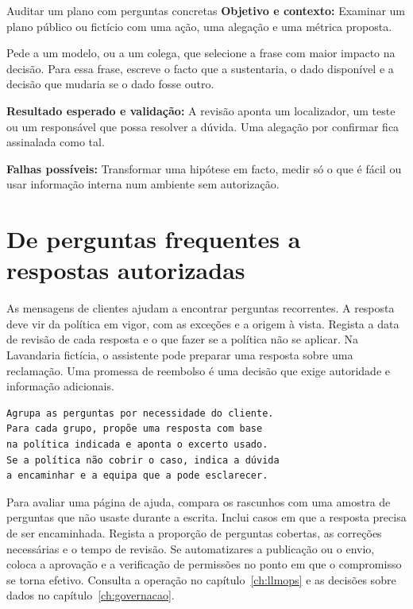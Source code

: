 \begin{promptlabbox}{Auditar um plano com perguntas concretas}
\textbf{Objetivo e contexto:} Examinar um plano público ou fictício com uma ação, uma alegação e uma métrica proposta.

Pede a um modelo, ou a um colega, que selecione a frase com maior impacto na decisão. Para essa frase, escreve o facto que a sustentaria, o dado disponível e a decisão que mudaria se o dado fosse outro.

\textbf{Resultado esperado e validação:} A revisão aponta um localizador, um teste ou um responsável que possa resolver a dúvida. Uma alegação por confirmar fica assinalada como tal.

\textbf{Falhas possíveis:} Transformar uma hipótese em facto, medir só o que é fácil ou usar informação interna num ambiente sem autorização.
\end{promptlabbox}

\section{De perguntas frequentes a respostas autorizadas}

As mensagens de clientes ajudam a encontrar perguntas recorrentes. A resposta deve vir da política em vigor, com as exceções e a origem à vista. Regista a data de revisão de cada resposta e o que fazer se a política não se aplicar. Na Lavandaria fictícia, o assistente pode preparar uma resposta sobre uma reclamação. Uma promessa de reembolso é uma decisão que exige autoridade e informação adicionais.

\begin{lstlisting}
Agrupa as perguntas por necessidade do cliente.
Para cada grupo, propõe uma resposta com base
na política indicada e aponta o excerto usado.
Se a política não cobrir o caso, indica a dúvida
a encaminhar e a equipa que a pode esclarecer.
\end{lstlisting}

Para avaliar uma página de ajuda, compara os rascunhos com uma amostra de perguntas que não usaste durante a escrita. Inclui casos em que a resposta precisa de ser encaminhada. Regista a proporção de perguntas cobertas, as correções necessárias e o tempo de revisão. Se automatizares a publicação ou o envio, coloca a aprovação e a verificação de permissões no ponto em que o compromisso se torna efetivo. Consulta a operação no capítulo~\ref{ch:llmops} e as decisões sobre dados no capítulo~\ref{ch:governacao}.
